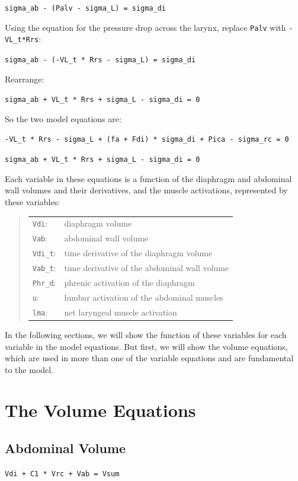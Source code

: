 \documentclass[12pt,openany,oneside]{book}
\newcommand{\ticode}[1]{\texttt{#1}}
\begin{document}
\ticode{sigma\_ab - (Palv - sigma\_L) = sigma\_di}

Using the equation for the pressure drop across the larynx, replace
\ticode{Palv} with \ticode{-VL\_t*Rrs}:

\ticode{sigma\_ab - (-VL\_t * Rrs - sigma\_L) = sigma\_di}

Rearrange:

\ticode{sigma\_ab + VL\_t * Rrs + sigma\_L - sigma\_di = 0}


So the two model equations are:

\ticode{-VL\_t * Rrs - sigma\_L + (fa + Fdi) * sigma\_di + Pica - sigma\_rc = 0}

\ticode{sigma\_ab + VL\_t * Rrs + sigma\_L - sigma\_di = 0}


Each variable in these equations is a function of the diaphragm and
abdominal wall volumes and their derivatives, and the muscle
activations, represented by these variables:
\begin{quote}
\begin{tabular}{@{}ll@{}}
\ticode{Vdi}:&   diaphragm volume\\
\ticode{Vab}:&   abdominal wall volume\\
\ticode{Vdi\_t}:& time derivative of the diaphragm volume\\
\ticode{Vab\_t}:& time derivative of the abdominal wall volume\\
\ticode{Phr\_d}:& phrenic activation of the diaphragm\\
\ticode{u}:&     lumbar activation of the abdominal muscles\\
\ticode{lma}:&   net laryngeal muscle activation
\end{tabular}
\end{quote}

In the following sections, we will show the function of these
variables for each variable in the model equations. But first, we
will show the volume equations, which are used in more than one of the
variable equations and are fundamental to the model.

\section{The Volume Equations}
\label{The Volume Equations}

\subsection{Abdominal Volume}
\label{abdominal volume}
\ticode{Vdi + C1 * Vrc + Vab = Vsum}
\end{document}
